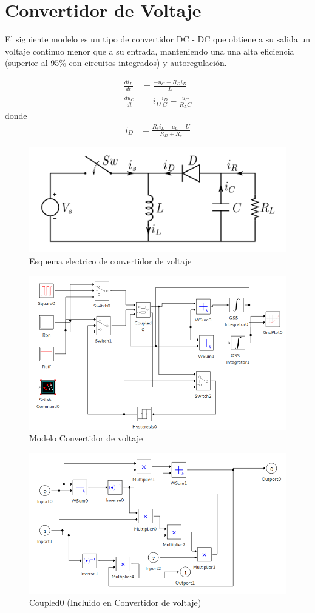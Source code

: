 \section{Convertidor de Voltaje}
	El siguiente modelo es un tipo de convertidor DC - DC que obtiene a su  salida  un  voltaje  continuo  menor  que  a  su entrada, manteniendo una una  alta eficiencia (superior al 95\% con circuitos integrados) y autoregulación.

\begin{align*}
\frac{di_{L}}{dt} & = \frac{-u_{C} - R_D i_D }{L}\\
\frac{du_C}{dt} & =i_D \frac{i_D}{C} - \frac{u_C}{R_L C }
\end{align*}
donde
\begin{align*}
i_D & = \frac{R_s i_L - u_C - U }{R_D + R_s}
\end{align*}


\begin{figure}[H]
\centering
 \includegraphics[width=.60\linewidth]{Buckboost_conventions}
 \caption{Esquema electrico de convertidor de voltaje}
\end{figure}

\begin{figure}[H]
\includegraphics[width=0.75\linewidth]{buck_disk}
\caption{Modelo Convertidor de voltaje}
\end{figure}

\begin{figure}[H]
\includegraphics[width=0.75\linewidth]{buck_disk_coupled0}
\caption{Coupled0 (Incluido en Convertidor de voltaje)}
\end{figure}

